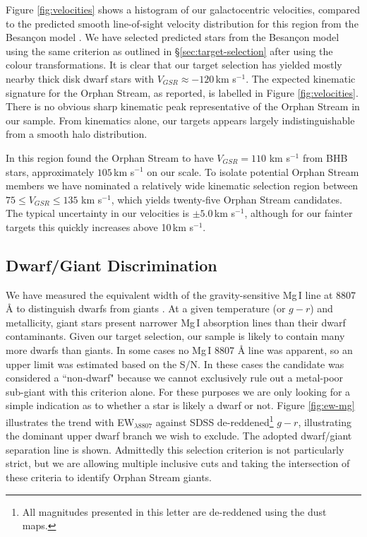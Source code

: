 \documentclass[10pt,apjl]{emulateapj}
\begin{document}
Figure \ref{fig:velocities} shows a histogram of our galactocentric velocities, compared to the predicted smooth line-of-sight velocity distribution for this region from the Besan\c{c}on model \citep{Robin_et-al_2003}. We have selected predicted stars from the Besan\c{c}on model using the same criterion as outlined in \S\ref{sec:target-selection} after using the \citet{Jordi_et-al_2006} colour transformations. It is clear that our target selection has yielded mostly nearby thick disk dwarf stars with $V_{GSR} \approx -120$\,km s$^{-1}$. The expected kinematic signature for the Orphan Stream, as \citet{Newberg_et-al_2010} reported, is labelled in Figure \ref{fig:velocities}. There is no obvious sharp kinematic peak representative of the Orphan Stream in our sample. From kinematics alone, our targets appears largely indistinguishable from a smooth halo distribution.

In this region \citet{Newberg_et-al_2010} found the Orphan Stream to have $V_{GSR} = 110$ km s$^{-1}$ from BHB stars, approximately $105$\,km s$^{-1}$ on our scale. To isolate potential Orphan Stream members we have nominated a relatively wide kinematic selection region between $75 \leq V_{GSR} \leq 135$ km s$^{-1}$, which yields twenty-five Orphan Stream candidates. The typical uncertainty in our velocities is $\pm{}5.0$\,km s$^{-1}$, although for our fainter targets this quickly increases above 10\,km s$^{-1}$.

\subsection{Dwarf/Giant Discrimination}
\label{sec:dwarf-giant}

We have measured the equivalent width of the gravity-sensitive Mg\,\textsc{I} line at 8807 \AA{} to distinguish dwarfs from giants \citep{Battaglia_Starkenburg_2012}. At a given temperature (or $g - r$) and metallicity, giant stars present narrower Mg\,\textsc{I} absorption lines than their dwarf contaminants. Given our target selection, our sample is likely to contain many more dwarfs than giants. In some cases no Mg\,\textsc{I} 8807 \AA{} line was apparent, so an upper limit was estimated based on the S/N. In these cases the candidate was considered a ``non-dwarf" because we cannot exclusively rule out a metal-poor sub-giant with this criterion alone. For these purposes we are only looking for a simple indication as to whether a star is likely a dwarf or not. Figure \ref{fig:ew-mg} illustrates the trend with EW$_{\lambda8807}$ against SDSS de-reddened\footnote{All magnitudes presented in this letter are de-reddened using the \citet{Schlegel_Finkbeiner_Davis_1998} dust maps.} $g - r$, illustrating the dominant upper dwarf branch we wish to exclude. The adopted dwarf/giant separation line is shown. Admittedly this selection criterion is not particularly strict, but we are allowing multiple inclusive cuts and taking the intersection of these criteria to identify Orphan Stream giants.
\end{document}
